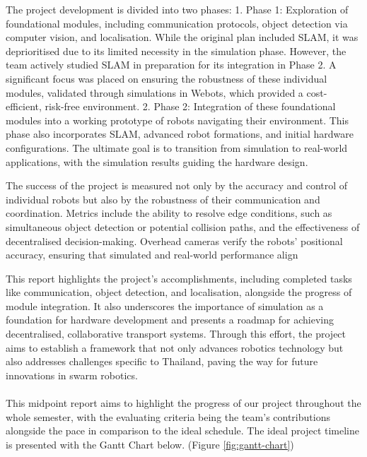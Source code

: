 The project development is divided into two phases:
	1.	Phase 1: Exploration of foundational modules, including communication protocols, object detection via computer vision, and localisation. While the original plan included SLAM, it was deprioritised due to its limited necessity in the simulation phase. However, the team actively studied SLAM in preparation for its integration in Phase 2. A significant focus was placed on ensuring the robustness of these individual modules, validated through simulations in Webots, which provided a cost-efficient, risk-free environment.
	2.	Phase 2: Integration of these foundational modules into a working prototype of robots navigating their environment. This phase also incorporates SLAM, advanced robot formations, and initial hardware configurations. The ultimate goal is to transition from simulation to real-world applications, with the simulation results guiding the hardware design.

The success of the project is measured not only by the accuracy and control of individual robots but also by the robustness of their communication and coordination. Metrics include the ability to resolve edge conditions, such as simultaneous object detection or potential collision paths, and the effectiveness of decentralised decision-making. Overhead cameras verify the robots’ positional accuracy, ensuring that simulated and real-world performance align

This report highlights the project’s accomplishments, including completed tasks like communication, object detection, and localisation, alongside the progress of module integration. It also underscores the importance of simulation as a foundation for hardware development and presents a roadmap for achieving decentralised, collaborative transport systems. Through this effort, the project aims to establish a framework that not only advances robotics technology but also addresses challenges specific to Thailand, paving the way for future innovations in swarm robotics.

\paragraph*{}
This midpoint report aims to highlight the progress of our project throughout the whole semester, with the evaluating criteria being the team's contributions alongside the pace in comparison to the ideal schedule. The ideal project timeline is presented with the Gantt Chart below. (Figure \ref{fig:gantt-chart})


